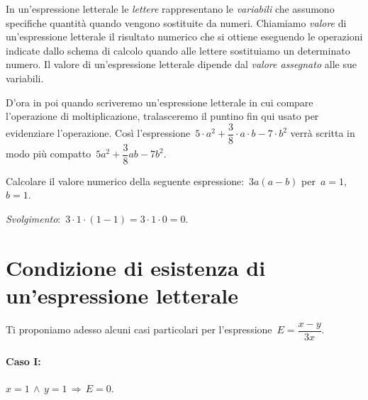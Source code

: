  \begin{definizione}
In un'espressione letterale le \emph{lettere} rappresentano le \emph{variabili} che assumono specifiche quantità
quando vengono sostituite da numeri.
Chiamiamo \emph{valore} di un'espressione letterale il risultato numerico che si ottiene eseguendo le operazioni indicate dallo
schema di calcolo quando alle lettere sostituiamo un determinato numero. Il valore di un'espressione letterale dipende dal \emph{valore assegnato} alle sue variabili.
\end{definizione}

D'ora in poi quando scriveremo un'espressione letterale in cui compare
l'operazione di moltiplicazione, tralasceremo il puntino fin qui usato per evidenziare l'operazione.
Così l'espressione~$5\cdot a^{2}+\dfrac{3}{8}\cdot a\cdot b-7\cdot b^{2}$ verrà scritta in modo
più compatto~$5a^{2}+\dfrac{3}{8}ab-7b^{2}$.

\begin{exrig}
 \begin{esempio}
Calcolare il valore numerico della seguente espressione:~$3a(a-b)$ per~$a=1$, $b=1$.

\emph{Svolgimento}:~$3\cdot 1\cdot (1-1)=3\cdot 1\cdot 0=0$.
\end{esempio}
 \end{exrig}

\ovalbox{\risolvii \ref{ese:9.12}, \ref{ese:9.13}, \ref{ese:9.14}, \ref{ese:9.15}, \ref{ese:9.16}, \ref{ese:9.17}, \ref{ese:9.18}, \ref{ese:9.19}, \ref{ese:9.20}, \ref{ese:9.21}, \ref{ese:9.22}}

\section{Condizione di esistenza di un'espressione letterale}
Ti proponiamo adesso alcuni casi particolari per
l'espressione~$E=\dfrac{x-y}{3x}$.

\paragraph{Caso I:} $x=1\,\wedge\, y=1\, \Rightarrow\, E=0$.
%

